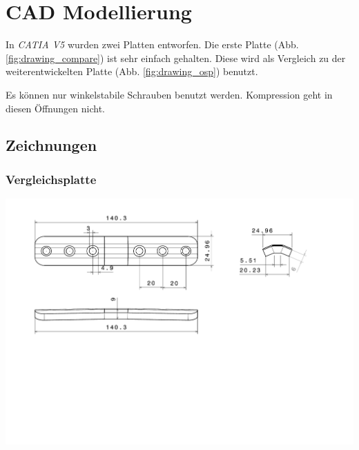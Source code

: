 \section{CAD Modellierung}

	In \textit{CATIA V5} wurden zwei Platten entworfen. Die erste Platte (Abb. \ref{fig:drawing_compare}) ist
	sehr einfach gehalten. Diese wird als Vergleich zu der weiterentwickelten Platte (Abb. \ref{fig:drawing_osp})
	benutzt.
	
	Es können nur winkelstabile Schrauben benutzt werden. Kompression geht in diesen Öffnungen nicht.

	\subsection{Zeichnungen}
	
		\subsubsection{Vergleichsplatte}
			\begin{Figure}
				\centering
				\includegraphics[trim={1.5cm 8.5cm 3.5cm 0.5cm},clip,width=15cm]{content/drawing_compare.pdf}
				\label{fig:drawing_compare}
			\end{Figure}
		
